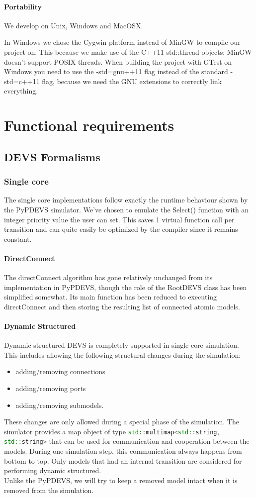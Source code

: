 \documentclass[8pt,a4paper]{report}
\begin{document}
\subsubsection{Portability}
We develop on Unix, Windows and MacOSX.

In Windows we chose the Cygwin platform instead of MinGW to compile our project on. This because we make use of the C++11 std::thread objects; MinGW doesn't support POSIX threads. When building the project with GTest on Windows you need to use the -std=gnu++11 flag instead of the standard -std=c++11 flag, because we need the GNU extensions to correctly link everything.

\chapter{Functional requirements}
\section{DEVS Formalisms}
\subsection{Single core}
The single core implementations follow exactly the runtime behaviour shown by the PyPDEVS simulator. We've chosen to emulate the Select() function with an integer priority value the user can set. This saves 1 virtual function call per transition and can quite easily be optimized by the compiler since it remains constant.
\subsubsection{DirectConnect}
The directConnect algorithm has gone relatively unchanged from its implementation in PyPDEVS, though the role of the RootDEVS class has been simplified somewhat. Its main function has been reduced to executing directConnect and then storing the resulting list of connected atomic models.
\subsubsection{Dynamic Structured}
Dynamic structured DEVS is completely supported in single core simulation. This includes allowing the following structural changes during the simulation:
\begin{itemize}
	\item adding/removing connections
	\item adding/removing ports
	\item adding/removing submodels.
\end{itemize}
These changes are only allowed during a special phase of the simulation. The simulator provides a map object of type \lstinline[language=C++,basicstyle=\small\color{black}]{std::multimap<std::string, std::string>} that can be used for communication and cooperation between the models. During one simulation step, this communication always happens from bottom to top. Only models that had an internal transition are considered for performing dynamic structured.\\
Unlike the PyPDEVS, we will try to keep a removed model intact when it is removed from the simulation.
\end{document}
